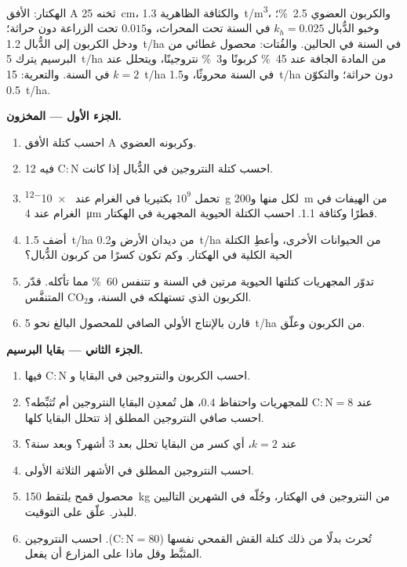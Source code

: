 \begin{problem}
\label{pb:b2:living-soil:1}
الهكتار: الأفق A ثخنه \qty{25}{cm}، والكثافة الظاهرية
\qty{1.3}{t/m^3}، والكربون العضوي \qty{2.5}{\%}؛ وخبو الدُّبال $k_h =
0.025$ في السنة تحت المحراث، و$0.015$ تحت الزراعة دون حراثة؛ ودخل الكربون
إلى الدُّبال \qty{1.2}{t/ha} في السنة في الحالين. والفُتات: محصول
غطائي من البرسيم يترك \qty{5}{t/ha} من المادة الجافة عند
\qty{45}{\%} كربونًا و\qty{3}{\%} نتروجينًا، ويتحلل عند $k = 2$
في السنة. والتعرية: \qty{15}{t/ha} في السنة محروثًا، و\qty{1.5}{t/ha}
دون حراثة؛ والتكوّن \qty{0.5}{t/ha}.

\medskip
\noindent\textbf{الجزء الأول --- المخزون.}
\begin{enumerate}
  \item احسب كتلة الأفق A وكربونه العضوي.
  \item احسب كتلة النتروجين في الدُّبال إذا كانت
        $\mathrm{C:N}$ فيه 12.
  \item تحمل  $10^{9}$ بكتيريا في الغرام عند \qty{e-12}{g}
        لكل منها و\qty{200}{m} من الهيفات في الغرام عند \qty{4}{\micro m}
        قطرًا وكثافة 1.1. احسب الكتلة الحيوية المجهرية في
        الهكتار.
  \item أضف \qty{1.5}{t/ha} من ديدان الأرض و\qty{0.2}{t/ha} من
        الحيوانات الأخرى، وأعطِ الكتلة الحية الكلية في الهكتار.
        وكم تكون كسرًا من كربون الدُّبال؟
  \item تدوّر المجهريات كتلتها الحيوية مرتين في السنة و
        تتنفس \qty{60}{\%} مما تأكله. قدّر الكربون
        الذي تستهلكه في السنة، و$\mathrm{CO_2}$ المتنفَّس.
  \item قارن بالإنتاج الأولي الصافي للمحصول البالغ نحو
        \qty{5}{t/ha} من الكربون وعلّق.
\end{enumerate}

\medskip
\noindent\textbf{الجزء الثاني --- بقايا البرسيم.}
\begin{enumerate}[resume]
  \item احسب الكربون والنتروجين في البقايا و
        $\mathrm{C:N}$ فيها.
  \item عند $\mathrm{C:N} = 8$ للمجهريات واحتفاظ $0.4$، هل
        تُمعدِن البقايا النتروجين أم تُثبِّطه؟ احسب
        صافي النتروجين المطلق إذ تتحلل البقايا كلها.
  \item عند $k = 2$، أي كسر من البقايا تحلل بعد
        3 أشهر؟ وبعد سنة؟
  \item احسب النتروجين المطلق في الأشهر الثلاثة الأولى.
  \item محصول قمح يلتقط \qty{150}{kg} من النتروجين في الهكتار،
        وجُلّه في الشهرين التاليين للبذر. علّق على التوقيت.
  \item تُحرث بدلًا من ذلك كتلة القش القمحي نفسها ($\mathrm{C:N} = 80$).
        احسب النتروجين المثبَّط وقل
        ماذا على المزارع أن يفعل.
\end{enumerate}


\end{problem}
